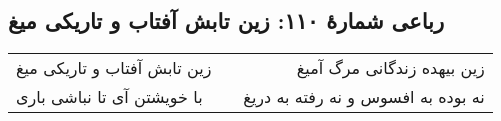 \begin{center}
\section*{رباعی شمارهٔ ۱۱۰:  زین تابش آفتاب و تاریکی میغ}
\label{sec:110}
\begin{longtable}{l p{0.5cm} r}
 زین تابش آفتاب و تاریکی میغ
&&
زین بیهده زندگانی مرگ آمیغ
\\
با خویشتن آی تا نباشی باری
&&
نه بوده به افسوس و نه رفته به دریغ
\\
\end{longtable}
\end{center}
